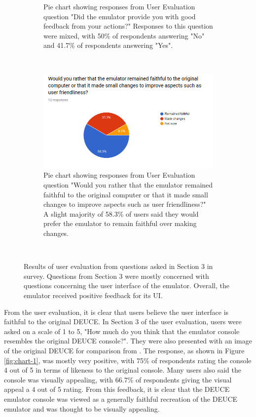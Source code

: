 \documentclass{l4proj}
\begin{document}
\begin{figure}[t]
\begin{subfigure}[t]{0.45\textwidth}
		\caption{Pie chart showing responses from User Evaluation question "Did the emulator provide you with good feedback from your actions?" Responses to this question were mixed, with 50\% of respondents answering "No" and 41.7\% of respondents answering "Yes".}
		\label{fig:chart-3}
	\end{subfigure}
	~ %
	\begin{subfigure}[t]{0.45\textwidth}
		\includegraphics[width=\textwidth]{images/chart-4}
		\caption{Pie chart showing responses from User Evaluation question "Would you rather that the emulator remained faithful to the original computer or that it made small changes to improve aspects such as user friendliness?" A slight majority of 58.3\% of users said they would prefer the emulator to remain faithful over making changes.}
		\label{fig:chart-4}
	\end{subfigure}
	~ %
	\caption{Results of user evaluation from questions asked in Section 3 in survey. Questions from Section 3 were mostly concerned with questions concerning the user interface of the emulator. Overall, the emulator received positive feedback for its UI.}
	\label{fig:eval-ui}
\end{figure}

From the user evaluation, it is clear that users believe the user interface is faithful to the original DEUCE. In Section 3 of the user evaluation, users were asked on a scale of 1 to 5, "How much do you think that the emulator console resembles the original DEUCE console?". They were also presented with an image of the original DEUCE for comparison from \citet{chilton19}. The response, as shown in Figure \ref{fig:chart-1}, was mostly very positive, with 75\% of respondents rating the console 4 out of 5 in terms of likeness to the original console. Many users also said the console was visually appealing, with 66.7\% of respondents giving the visual appeal a 4 out of 5 rating. From this feedback, it is clear that the DEUCE emulator console was viewed as a generally faithful recreation of the DEUCE emulator and was thought to be visually appealing.
\end{document}
